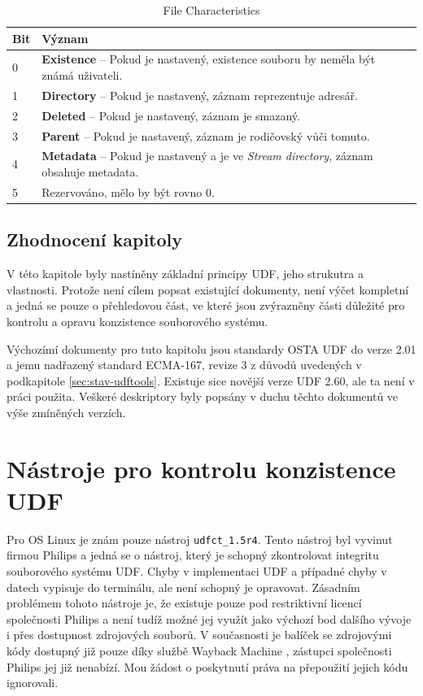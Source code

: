 \begin{table}
    \centering
    \begin{tabular}{ | l | l |}
        \hline
        Bit & Význam \\ \hline\hline
        0   & \textbf{Existence} -- Pokud je nastavený, existence souboru by neměla být známá uživateli.\\\hline
        1   & \textbf{Directory} -- Pokud je nastavený, záznam reprezentuje adresář.\\\hline
        2   & \textbf{Deleted} -- Pokud je nastavený, záznam je smazaný.\\\hline
        3   & \textbf{Parent} -- Pokud je nastavený, záznam je rodičovský vůči tomuto.\\\hline
        4   & \textbf{Metadata} -- Pokud je nastavený a je ve \textit{Stream directory}, záznam obsahuje metadata.\\\hline
        5   & Rezervováno, mělo by být rovno 0.\\\hline
    \end{tabular}
    \caption{File Characteristics\label{tab:file-characteristics}}
\end{table}

\section{Zhodnocení kapitoly}
V této kapitole byly nastíněny základní principy UDF, jeho strukutra a vlastnosti. Protože není cílem popsat existující dokumenty, není výčet kompletní a jedná se pouze o přehledovou část, ve které jsou zvýrazněny části důležité pro kontrolu a opravu konzistence souborového systému.

Výchozímí dokumenty pro tuto kapitolu jsou standardy OSTA UDF do verze 2.01 \cite{osta-udf-0201} a jemu nadřazený standard ECMA-167, revize 3 \cite{ecma-167} z důvodů uvedených v podkapitole \ref{sec:stav-udftools}. Existuje sice novější verze UDF 2.60, ale ta není v práci použita. Veškeré deskriptory byly popsány v duchu těchto dokumentů ve výše zmíněných verzích.


\chapter{Nástroje pro kontrolu konzistence UDF}
\label{sec:nastroje}
Pro OS Linux je znám pouze nástroj \texttt{udfct\_1.5r4}. Tento nástroj byl vyvinut firmou Philips a jedná se o nástroj, který je schopný zkontrolovat integritu souborového systému UDF. Chyby v implementaci UDF a případné chyby v datech vypisuje do terminálu, ale není schopný je opravovat. Zásadním problémem tohoto nástroje je, že existuje pouze pod restriktivní licencí společnosti Philips a není tudíž možné jej využít jako výchozí bod dalšího vývoje i přes dostupnost zdrojových souborů. V současnosti je balíček se zdrojovými kódy dostupný již pouze díky službě Wayback Machine \cite{wayback}, zástupci společnosti Philips jej již nenabízí. Mou žádost o poskytnutí práva na přepoužití jejich kódu ignorovali.

